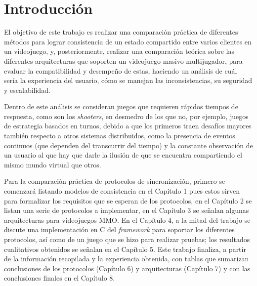 \section*{Introducción}


El objetivo de este trabajo es realizar una comparación práctica de diferentes métodos para lograr consistencia de un estado compartido entre varios clientes en un videojuego, y, posteriormente, realizar una comparación teórica sobre las diferentes arquitecturas que soporten un videojuego masivo multijugador, para evaluar la compatibilidad y desempeño de estas, haciendo un análisis de cuál sería la experiencia del usuario, cómo se manejan las inconsistencias, su seguridad y escalabilidad.

Dentro de este análisis se consideran juegos que requieren rápidos tiempos de respuesta, como son los \emph{shooters}, en desmedro de los que no, por ejemplo, juegos de estrategia basados en turnos, debido a que los primeros traen desafíos mayores también respecto a otros sistemas distribuidos, como la presencia de eventos continuos (que dependen del transcurrir del tiempo) y la constante observación de un usuario al que hay que darle la ilusión de que se encuentra compartiendo el mismo mundo virtual que otros.

Para la comparación práctica de protocolos de sincronización, primero se comenzará listando modelos de consistencia en el Capítulo 1 pues estos sirven para formalizar los requisitos que se esperan de los protocolos, en el Capítulo 2 se listan una serie de protocolos a implementar, en el Capítulo 3 se señalan algunas arquitecturas para videojuegos MMO. En el Capítulo 4, a la mitad del trabajo se discute una implementación en C del \emph{framework} para soportar los diferentes protocolos, así como de un juego que se hizo para realizar pruebas; los resultados cualitativos obtenidos se señalan en el Capítulo 5. Este trabajo finaliza, a partir de la información recopilada y la experiencia obtenida, con tablas que sumarizan conclusiones de los protocolos (Capítulo 6) y arquitecturas (Capítulo 7) y con las conclusiones finales en el Capítulo 8.


